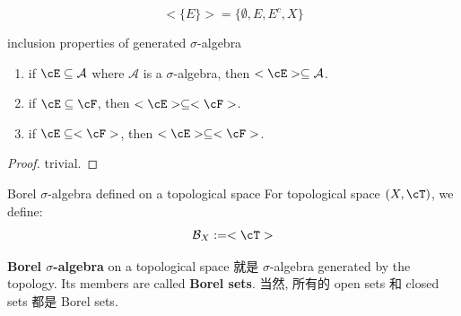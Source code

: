 \begin{example}
\begin{equation}
    <\{ E\}> = \{ \emptyset, E, E^c, X       \}
\end{equation}
\end{example}


\begin{lemma}{inclusion properties of generated $\sigma$-algebra}
\label{inclusion properties of generated sigma-algebra}
\begin{enumerate}
    \item if $\cE \sub \mathcal{A}$ where $\mathcal{A}$ is a $\sigma$-algebra, then $<\cE> \sub \mathcal{A}$.
    \item if $\cE \sub \cF$, then $<\cE> \sub <\cF>$.
    \item if $\cE \sub <\cF>$, then $<\cE> \sub <\cF>$.
\end{enumerate}
\end{lemma}
\begin{proof}
    trivial.
\end{proof}

\begin{definition}{Borel $\sigma$-algebra defined on a topological space}
For topological space $(X, \cT)$, we define:
$$
\mathcal{B}_X := <\cT>
$$
\end{definition}
\noindent \textbf{Borel $\sigma$-algebra} on a topological space 就是 $\sigma$-algebra generated by the topology. Its members are called \textbf{Borel sets}. 当然, 所有的 open sets 和 closed sets 都是 Borel sets.




